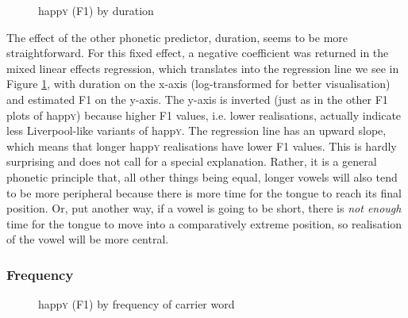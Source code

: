 	\begin{figure}[h!]
		\centering
		\resizebox{0.5\linewidth}{!}{}
		\caption{happ\textsc{y} (F1) by duration}
		\label{fig.scatter.f1w.happy.dur}
	\end{figure}

The effect of the other phonetic predictor, duration, seems to be more straightforward.
For this fixed effect, a negative coefficient was returned in the mixed linear effects regression, which translates into the regression line we see in Figure \ref{fig.scatter.f1w.happy.dur}, with duration on the x-axis (log-transformed for better visualisation) and estimated F1 on the y-axis.
The y-axis is inverted (just as in the other F1 plots of happ\textsc{y}) because higher F1 values, i.e. lower realisations, actually indicate less Liverpool-like variants of happ\textsc{y}.
The regression line has an upward slope, which means that longer happ\textsc{y} realisations have lower F1 values.
This is hardly surprising and does not call for a special explanation.
Rather, it is a general phonetic principle that, all other things being equal, longer vowels will also tend to be more peripheral because there is more time for the tongue to reach its final position.
Or, put another way, if a vowel is going to be short, there is \emph{not enough} time for the tongue to move into a comparatively extreme position, so realisation of the vowel will be more central.

			\subsubsection{Frequency}
			\label{sec.prod.res.vow.happy.f1.zipf}

	\begin{figure}[h!]
		\centering
		\resizebox{0.5\linewidth}{!}{}
		\caption{happ\textsc{y} (F1) by frequency of carrier word}
		\label{fig.scatter.f1w.happy.zipf}
	\end{figure}

